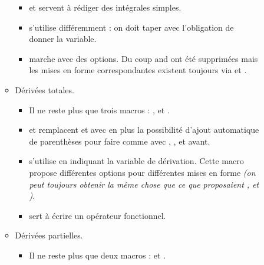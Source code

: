 \documentclass[12pt,a4paper]{book}
\begin{document}
\begin{description}
\begin{itemize}[itemsep=.5em]
\begin{itemize}[itemsep=.5em]
        \begin{itemize}[itemsep=.5em, label=$\rightarrow$]
            \item {} et  servent à rédiger des intégrales simples.

            \item {} s'utilise différemment : on doit taper  avec l'obligation de donner la variable.
            
            \item {} marche avec des options.
                  Du coup  and  ont été supprimées mais les mises en forme correspondantes existent toujours via  et .
	    \end{itemize}
	    
        
        \item Dérivées totales.
        
        \begin{itemize}[itemsep=.5em, label=$\rightarrow$]
            \item Il ne reste plus que trois macros : ,  et .

            \item {} et  remplacent  et  avec en plus la possibilité d'ajout automatique de parenthèses pour faire comme avec , ,  et  avant.


            \item {} s'utilise en indiquant la variable de dérivation. Cette macro propose différentes options pour différentes mises en forme 
                  \emph{(on peut toujours obtenir la même chose que ce que proposaient ,  et )}.

            \item {} sert à écrire un opérateur fonctionnel.
	    \end{itemize}


        \item Dérivées partielles.
        
        \begin{itemize}[itemsep=.5em, label=$\rightarrow$]
            \item Il ne reste plus que deux macros :  et .


\end{itemize}
\end{itemize}
\end{itemize}
\end{description}
\end{document}
